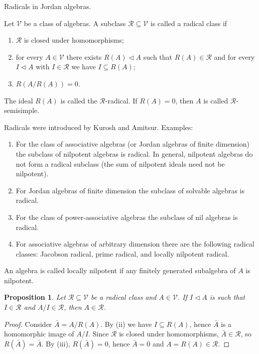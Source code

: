 \documentclass{article}
\newtheorem{proposition}[theorem]{Proposition}
\begin{document}
Radicals in Jordan algebras.

\begin{definition}
Let $\mathcal{V}$ be a class of algebras. A subclass $\mathcal{R} \subseteq \mathcal{V}$ is called a radical class if
\begin{enumerate}
    \item $\mathcal{R}$ is closed under homomorphisms;
    \item for every $A \in \mathcal{V}$ there exists $R(A) \triangleleft A$ such that $R(A) \in \mathcal{R}$ and for every $I \triangleleft A$ with $I \in \mathcal{R}$ we have $I \subseteq R(A)$;
    \item $R(A / R(A))=0$.
\end{enumerate}
The ideal $R(A)$ is called the $\mathcal{R}$-radical. If $R(A)=0$, then $A$ is called $\mathcal{R}$-semisimple.
\end{definition}

Radicals were introduced by Kurosh and Amitsur. Examples:
\begin{enumerate}
    \item For the class of associative algebras (or Jordan algebras of finite dimension) the subclass of nilpotent algebras is radical. In general, nilpotent algebras do not form a radical subclass (the sum of nilpotent ideals need not be nilpotent).
    \item For Jordan algebras of finite dimension the subclass of solvable algebras is radical.
    \item For the class of power-associative algebras the subclass of nil algebras is radical.
    \item For associative algebras of arbitrary dimension there are the following radical classes: Jacobson radical, prime radical, and locally nilpotent radical.
\end{enumerate}

An algebra is called locally nilpotent if any finitely generated subalgebra of $A$ is nilpotent.

\begin{proposition}
Let $\mathcal{R} \subseteq \mathcal{V}$ be a radical class and $A \in \mathcal{V}$. If $I \triangleleft A$ is such that $I \in \mathcal{R}$ and $A/I \in \mathcal{R}$, then $A \in \mathcal{R}$.
\end{proposition}

\begin{proof}
Consider $\bar{A} = A / R(A)$. By (ii) we have $I \subseteq R(A)$, hence $\bar{A}$ is a homomorphic image of $A/I$. Since $\mathcal{R}$ is closed under homomorphisms, $\bar{A} \in \mathcal{R}$, so $R(\bar{A}) = \bar{A}$. By (iii), $R(\bar{A})=0$, hence $\bar{A}=0$ and $A=R(A) \in \mathcal{R}$.
\end{proof}
\end{document}
